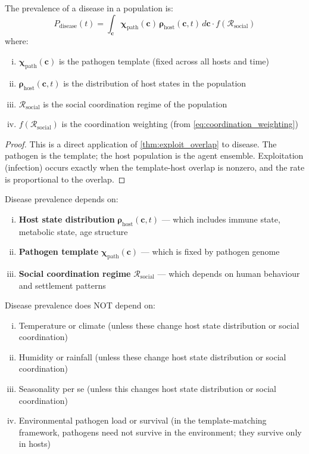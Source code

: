 \documentclass[11pt,twocolumn,a4paper]{article}
\newcommand{\Template}{\boldsymbol{\chi}}
\newcommand{\State}{\boldsymbol{\rho}}
\newcommand{\Coord}{\mathcal{R}}
\begin{document}
\begin{theorem}
\label{thm:disease_prev}
The prevalence of a disease in a population is:
\begin{equation}
P_{\mathrm{disease}}(t) = \int_{\mathbf{c}} \Template_{\mathrm{path}}(\mathbf{c}) \, \State_{\mathrm{host}}(\mathbf{c}, t) \, d\mathbf{c} \cdot f(\Coord_{\mathrm{social}})
\label{eq:disease_prevalence}
\end{equation}
where:
\begin{enumerate}[(i)]
\item $\Template_{\mathrm{path}}(\mathbf{c})$ is the pathogen template (fixed across all hosts and time)
\item $\State_{\mathrm{host}}(\mathbf{c}, t)$ is the distribution of host states in the population
\item $\Coord_{\mathrm{social}}$ is the social coordination regime of the population
\item $f(\Coord_{\mathrm{social}})$ is the coordination weighting (from \cref{eq:coordination_weighting})
\end{enumerate}
\end{theorem}

\begin{proof}
This is a direct application of \cref{thm:exploit_overlap} to disease. The pathogen is the template; the host population is the agent ensemble. Exploitation (infection) occurs exactly when the template-host overlap is nonzero, and the rate is proportional to the overlap.
\end{proof}

\begin{corollary}
Disease prevalence depends on:
\begin{enumerate}[(i)]
\item \textbf{Host state distribution} $\State_{\mathrm{host}}(\mathbf{c}, t)$ — which includes immune state, metabolic state, age structure
\item \textbf{Pathogen template} $\Template_{\mathrm{path}}(\mathbf{c})$ — which is fixed by pathogen genome
\item \textbf{Social coordination regime} $\Coord_{\mathrm{social}}$ — which depends on human behaviour and settlement patterns
\end{enumerate}
Disease prevalence does NOT depend on:
\begin{enumerate}[(i)]
\item Temperature or climate (unless these change host state distribution or social coordination)
\item Humidity or rainfall (unless these change host state distribution or social coordination)
\item Seasonality per se (unless this changes host state distribution or social coordination)
\item Environmental pathogen load or survival (in the template-matching framework, pathogens need not survive in the environment; they survive only in hosts)
\end{enumerate}
\end{corollary}
\end{document}

